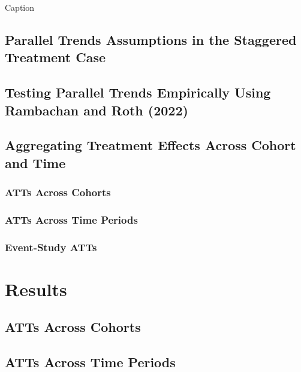 \documentclass[12pt]{article}
\begin{document}
    \newpage
    \begin{landscape}
       \begin{table}[H]
        \centering
        
        \caption{Caption}
        \label{tab:my_label}
    \end{table} 
    \end{landscape}
    
    \subsection{Parallel Trends Assumptions in the Staggered Treatment Case}
        
        \subsection{Testing Parallel Trends Empirically Using Rambachan and Roth (2022)}
    \subsection{Aggregating Treatment Effects Across Cohort and Time}
        \subsubsection{ATTs Across Cohorts}
        \subsubsection{ATTs Across Time Periods}
        \subsubsection{Event-Study ATTs}
    
\section{Results} \label{sec:result}
    \subsection{ATTs Across Cohorts}
    \subsection{ATTs Across Time Periods}
\end{document}

